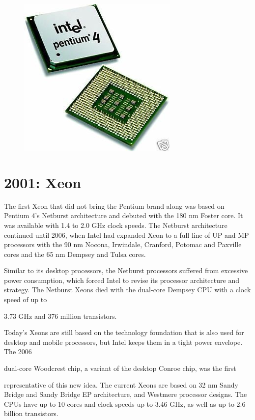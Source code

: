 \begin{figure}[ht!]
	\centering
\includegraphics[scale=0.5]{media/image20.jpeg}
\end{figure}

\hypertarget{xeon}{%
\section{2001: Xeon}\label{xeon}}

The first Xeon that did not bring the Pentium brand along was based on
Pentium 4's Netburst architecture and debuted with the 180 nm Foster
core. It was available with 1.4 to 2.0 GHz clock speeds. The Netburst
architecture continued until 2006, when Intel had expanded Xeon to a
full line of UP and MP processors with the 90 nm Nocona, Irwindale,
Cranford, Potomac and Paxville cores and the 65 nm Dempsey and Tulsa
cores.

Similar to its desktop processors, the Netburst processors suffered from
excessive power consumption, which forced Intel to revise its processor
architecture and strategy. The Netburst Xeons died with the dual-core
Dempsey CPU with a clock speed of up to

3.73 GHz and 376 million transistors.

Today's Xeons are still based on the technology foundation that is also
used for desktop and mobile processors, but Intel keeps them in a tight
power envelope. The 2006

dual-core Woodcrest chip, a variant of the desktop Conroe chip, was the
first

representative of this new idea. The current Xeons are based on 32 nm
Sandy Bridge and Sandy Bridge EP architecture, and Westmere processor
designs. The CPUs have up to 10 cores and clock speeds up to 3.46 GHz,
as well as up to 2.6 billion transistors.

